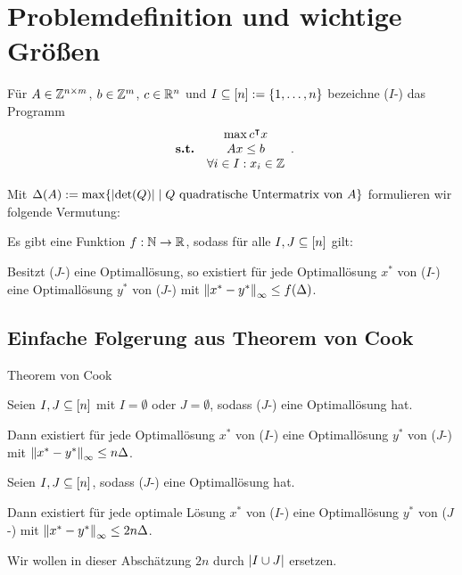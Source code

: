 \section{Problemdefinition und wichtige Größen}

\begin{frame}
	\begin{definition}
		Für $A\in\mathbb{Z}^{n\times m}$, $b\in\mathbb{Z}^m$, $c\in\mathbb{R}^n$ und $I\subseteq[n]:=\{1,\dots,n\}$ bezeichne ($I$-\MIPI) das Programm
		$$\begin{array}{lc}
		&\max c^\intercal x \\
		\textbf{s.t.} &Ax\leq b\\
		&\forall i\in I: x_i\in\mathbb{Z}
		\end{array}.$$
	\end{definition}

	\pause
	Mit $\Delta(A):=\max\{\lvert  \det(Q) \rvert \mid Q \text{ quadratische Untermatrix von } A \}$ formulieren wir folgende Vermutung:
	
	\pause
	\begin{conjecture}
		Es gibt eine Funktion $f: \mathbb{N}\rightarrow\mathbb{R}$, sodass für alle $I,J\subseteq[n]$ gilt:
		
		Besitzt ($J$-\MIPI) eine Optimallösung, so existiert für jede Optimallösung $x^*$ von ($I$-\MIPI) eine Optimallösung $y^*$ von ($J$-\MIPI) mit $\left\lVert x^* - y^*\right\rVert_\infty\leq f(\Delta)$.
	\end{conjecture}
\end{frame}

\subsection{Einfache Folgerung aus Theorem von Cook}
\begin{frame}{Theorem von Cook}
\begin{theorem}[Cook u. a., 1986]\label{thm:cook}
	Seien $I, J\subseteq[n]$ mit $I=\emptyset$ oder $J=\emptyset$, sodass ($J$-\MIPI) eine Optimallösung hat.
	
	Dann existiert für jede Optimallösung $x^*$ von ($I$-\MIPI) eine Optimallösung $y^*$ von ($J$-\MIPI) mit $\left\lVert x^*-y^*\right\rVert_\infty\leq n\Delta$.
\end{theorem}
\pause
\begin{korollar}
	Seien $I,J\subseteq[n]$, sodass ($J$-\MIPI) eine Optimallösung hat.
	
	Dann existiert für jede optimale Lösung $x^*$ von ($I$-\MIPI) eine Optimallösung $y^*$ von ($J$-\MIPI) mit $\left\lVert x^*-y^*\right\rVert_\infty\leq2 n\Delta$.
\end{korollar}
\pause
Wir wollen in dieser Abschätzung $2n$ durch $\lvert I\cup J \rvert$ ersetzen.
\end{frame}

